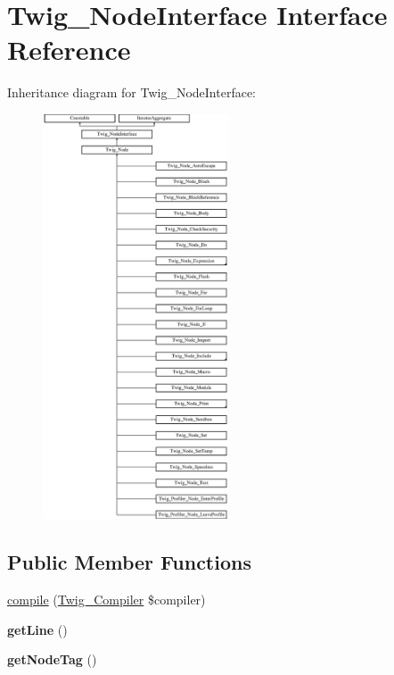 \hypertarget{interface_twig___node_interface}{}\section{Twig\+\_\+\+Node\+Interface Interface Reference}
\label{interface_twig___node_interface}
Inheritance diagram for Twig\+\_\+\+Node\+Interface\+:\begin{figure}[H]
\begin{center}
\leavevmode
\includegraphics[height=12.000000cm]{interface_twig___node_interface}
\end{center}
\end{figure}
\subsection*{Public Member Functions}
\begin{DoxyCompactItemize}
\item 
\hyperlink{interface_twig___node_interface_a4e0faa87c3fae583620b84d3607085da}{compile} (\hyperlink{class_twig___compiler}{Twig\+\_\+\+Compiler} \$compiler)
\item 
\hypertarget{interface_twig___node_interface_aef9c32f6066788a101028a1d4150f8cb}{}{\bfseries get\+Line} ()\label{interface_twig___node_interface_aef9c32f6066788a101028a1d4150f8cb}

\item 
\hypertarget{interface_twig___node_interface_ade3006d746f2e1ba1df08da2d613a632}{}{\bfseries get\+Node\+Tag} ()\label{interface_twig___node_interface_ade3006d746f2e1ba1df08da2d613a632}

\end{DoxyCompactItemize}


